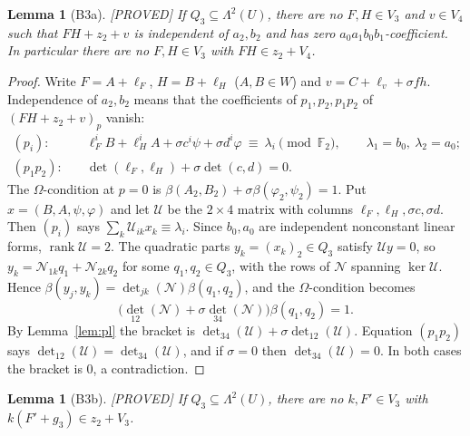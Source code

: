 \documentclass[11pt,a4paper]{article}
\theoremstyle{plain}
\newtheorem{lemma}[theorem]{Lemma}
\theoremstyle{definition}
\theoremstyle{remark}
\newcommand{\F}{\mathbb{F}_2}
\newcommand{\rk}{\operatorname{rank}}
\newcommand{\Lam}{\Lambda^{2}}
\newcommand{\status}[1]{\hfill\textsf{[#1]}}
\begin{document}
\begin{lemma}[B3a]\label{lem:B3a}\status{PROVED}
If $Q_3\subseteq\Lam(U)$, there are no $F,H\in V_3$ and $v\in V_4$ such that $FH+z_2+v$ is independent of $a_2,b_2$ and has zero $a_0a_1b_0b_1$-coefficient. In particular there are no $F,H\in V_3$ with $FH\in z_2+V_4$.
\end{lemma}

\begin{proof}
Write $F=A+\ell_F$, $H=B+\ell_H$ ($A,B\in W$) and $v=C+\ell_v+\sigma fh$. Independence of $a_2,b_2$ means that the coefficients of $p_1,p_2,p_1p_2$ of $(FH+z_2+v)_p$ vanish:
\begin{align*}
(p_i):&\quad \ell_F^iB+\ell_H^iA+\sigma c^i\psi+\sigma d^i\varphi\ \equiv\ \lambda_i\pmod{\F},\qquad \lambda_1=b_0,\ \lambda_2=a_0;\\
(p_1p_2):&\quad \det(\ell_F,\ell_H)+\sigma\det(c,d)=0 .
\end{align*}
The $\Omega$-condition at $p=0$ is $\beta(A_2,B_2)+\sigma\beta(\varphi_2,\psi_2)=1$. Put $x=(B,A,\psi,\varphi)$ and let $\mathcal U$ be the $2\times4$ matrix with columns $\ell_F,\ell_H,\sigma c,\sigma d$. Then $(p_i)$ says $\sum_k\mathcal U_{ik}x_k\equiv\lambda_i$.
Since $b_0,a_0$ are independent nonconstant linear forms, $\rk\mathcal U=2$. The quadratic parts $y_k=(x_k)_2\in Q_3$ satisfy $\mathcal Uy=0$, so $y_k=\mathcal N_{1k}q_1+\mathcal N_{2k}q_2$ for some $q_1,q_2\in Q_3$, with the rows of $\mathcal N$ spanning $\ker\mathcal U$. Hence $\beta(y_j,y_k)=\det_{jk}(\mathcal N)\beta(q_1,q_2)$, and the $\Omega$-condition becomes
\[
\bigl(\det_{12}(\mathcal N)+\sigma\det_{34}(\mathcal N)\bigr)\beta(q_1,q_2)=1 .
\]
By Lemma~\ref{lem:pl} the bracket is $\det_{34}(\mathcal U)+\sigma\det_{12}(\mathcal U)$. Equation $(p_1p_2)$ says $\det_{12}(\mathcal U)=\det_{34}(\mathcal U)$, and if $\sigma=0$ then $\det_{34}(\mathcal U)=0$. In both cases the bracket is $0$, a contradiction.
\end{proof}

\begin{lemma}[B3b]\label{lem:B3b}\status{PROVED}
If $Q_3\subseteq\Lam(U)$, there are no $k,F'\in V_3$ with $k(F'+g_3)\in z_2+V_3$.
\end{lemma}
\end{document}
